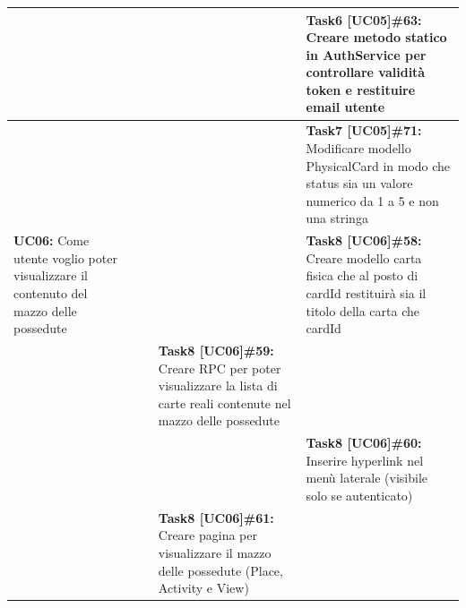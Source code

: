 \begin{landscape}
\begin{itemize}
\begin{tabular}{ | p{5cm} | p{3cm} | p{5cm} | p{5cm} | p{5cm}| }
                \hline
                & & & & \textbf{Task6 [UC05]\#63:} Creare metodo statico in AuthService per controllare validità token e restituire email utente \\
                \hline
                & & & & \textbf{Task7 [UC05]\#71:} Modificare modello PhysicalCard in modo che status sia un valore numerico da 1 a 5 e non una stringa \\
                \hline
                \textbf{UC06:} Come utente voglio poter visualizzare il contenuto del mazzo delle possedute
                & & & & \textbf{Task8 [UC06]\#58:} Creare modello carta fisica che al posto di cardId restituirà sia il titolo della carta che cardId \\
                \hline
                & & & \textbf{Task8 [UC06]\#59:} Creare RPC per poter visualizzare la lista di carte reali contenute nel mazzo delle possedute & \\
                \hline
                & &  & & \textbf{Task8 [UC06]\#60:} Inserire hyperlink nel menù laterale (visibile solo se autenticato) \\
                \hline
                & & & \textbf{Task8 [UC06]\#61:} Creare pagina per visualizzare il mazzo delle possedute (Place, Activity e View) & \\
                \hline
            \end{tabular}
        \end{itemize}


        \newpage


\end{landscape}
